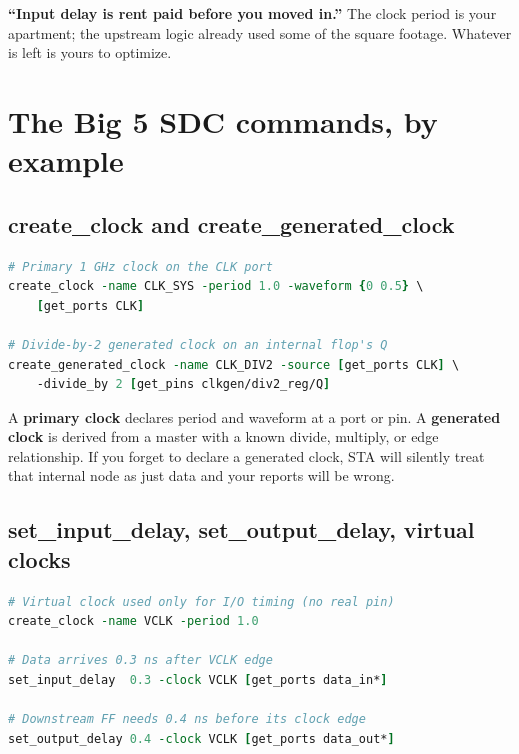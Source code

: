 \begin{hook}
\textbf{``Input delay is rent paid before you moved in.''} The clock period is your apartment; the upstream logic already used some of the square footage. Whatever is left is yours to optimize.
\end{hook}

\section{The Big 5 SDC commands, by example}

\subsection{create\_clock and create\_generated\_clock}

\begin{lstlisting}[style=eda, language=tcl, caption={Defining a primary clock and a divide-by-2 generated clock.}]
# Primary 1 GHz clock on the CLK port
create_clock -name CLK_SYS -period 1.0 -waveform {0 0.5} \
    [get_ports CLK]

# Divide-by-2 generated clock on an internal flop's Q
create_generated_clock -name CLK_DIV2 -source [get_ports CLK] \
    -divide_by 2 [get_pins clkgen/div2_reg/Q]
\end{lstlisting}

A \textbf{primary clock} declares period and waveform at a port or pin. A \textbf{generated clock} is derived from a master with a known divide, multiply, or edge relationship. If you forget to declare a generated clock, STA will silently treat that internal node as just data and your reports will be wrong.

\subsection{set\_input\_delay, set\_output\_delay, virtual clocks}

\begin{lstlisting}[style=eda, language=tcl, caption={Boundary I/O timing referenced to a virtual clock.}]
# Virtual clock used only for I/O timing (no real pin)
create_clock -name VCLK -period 1.0

# Data arrives 0.3 ns after VCLK edge
set_input_delay  0.3 -clock VCLK [get_ports data_in*]

# Downstream FF needs 0.4 ns before its clock edge
set_output_delay 0.4 -clock VCLK [get_ports data_out*]
\end{lstlisting}

